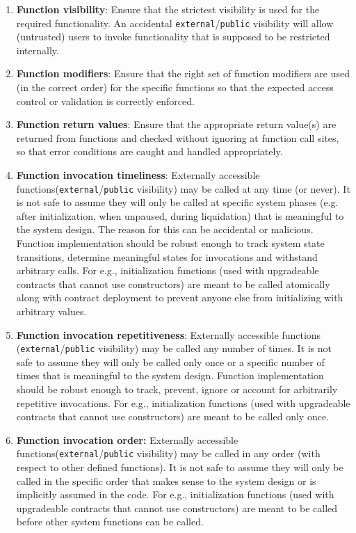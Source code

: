 \begin{enumerate}
\item\textbf{Function visibility}: Ensure that the strictest visibility is used for the required functionality. An accidental \verb|external|/\verb|public| visibility will allow (untrusted) users to invoke functionality that is supposed to be restricted internally.

\item\textbf{Function modifiers}: Ensure that the right set of function modifiers are used (in the correct order) for the specific functions so that the expected access control or validation is correctly enforced.

\item\textbf{Function return values}: Ensure that the appropriate return value(s) are returned from functions and checked without ignoring at function call sites, so that error conditions are caught and handled appropriately.

\item\textbf{Function invocation timeliness}: Externally accessible functions\linebreak (\verb|external|/\verb|public| visibility) may be called at any time (or never). It is not safe to assume they will only be called at specific system phases (e.g. after initialization, when unpaused, during liquidation) that is meaningful to the system design. The reason for this can be accidental or malicious. Function implementation should be robust enough to track system state transitions, determine meaningful states for invocations and withstand arbitrary calls. For e.g., initialization functions (used with upgradeable contracts that cannot use constructors) are meant to be called atomically along with contract deployment to prevent anyone else from initializing with arbitrary values.

\item\textbf{Function invocation repetitiveness}: Externally accessible functions (\verb|external|/\verb|public| visibility) may be called any number of times. It is not safe to assume they will only be called only once or a specific number of times that is meaningful to the system design. Function implementation should be robust enough to track, prevent, ignore or account for arbitrarily repetitive invocations. For e.g., initialization functions (used with upgradeable contracts that cannot use constructors) are meant to be called only once.

\item\textbf{Function invocation order: }Externally accessible functions\linebreak (\verb|external|/\verb|public| visibility) may be called in any order (with respect to other defined functions). It is not safe to assume they will only be called in the specific order that makes sense to the system design or is implicitly assumed in the code. For e.g., initialization functions (used with upgradeable contracts that cannot use constructors) are meant to be called before other system functions can be called.


\end{enumerate}

